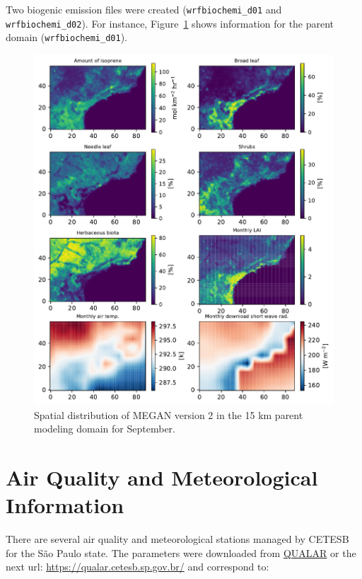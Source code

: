	Two biogenic emission files were created (\verb|wrfbiochemi_d01| and \verb|wrfbiochemi_d02|).
	For instance, Figure~\ref{fig:bioemis} shows information for the parent domain (\verb|wrfbiochemi_d01|). 
	
	\begin{figure}[!htb]
		\includegraphics[width=1\textwidth]{fig/biogenic_d01.pdf}
  		\caption{Spatial distribution of MEGAN version 2 in the 15 km parent modeling domain for September.}
  		\centering
  		\label{fig:bioemis}
	\end{figure}
	
\chapter{Air Quality and Meteorological Information}\label{ap01}
There are several air quality and meteorological stations managed by CETESB for the S\~{a}o Paulo state.
The parameters were downloaded from \href{https://qualar.cetesb.sp.gov.br/}{QUALAR} or the next url: \url{https://qualar.cetesb.sp.gov.br/} and correspond to:

